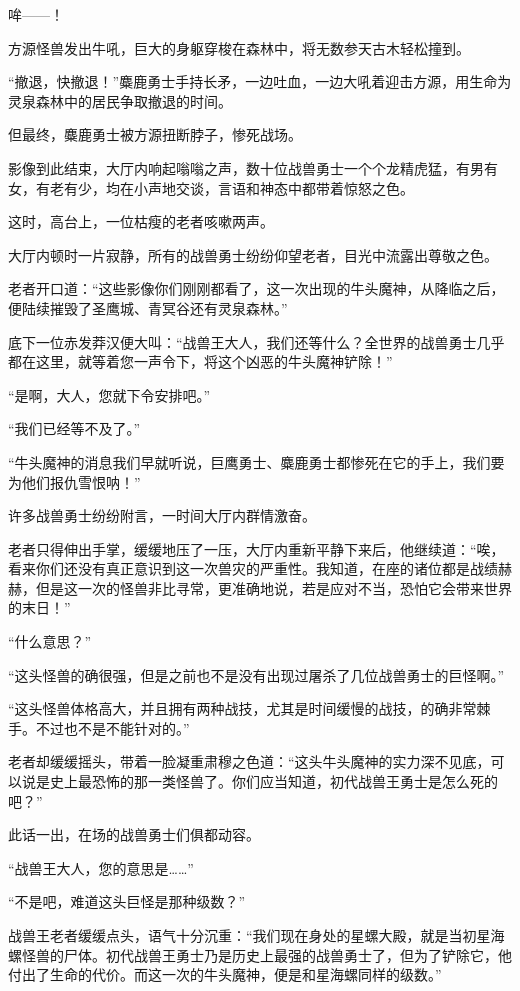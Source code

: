 
\begin{this_body}

哞——！

方源怪兽发出牛吼，巨大的身躯穿梭在森林中，将无数参天古木轻松撞到。

“撤退，快撤退！”麋鹿勇士手持长矛，一边吐血，一边大吼着迎击方源，用生命为灵泉森林中的居民争取撤退的时间。

但最终，麋鹿勇士被方源扭断脖子，惨死战场。

影像到此结束，大厅内响起嗡嗡之声，数十位战兽勇士一个个龙精虎猛，有男有女，有老有少，均在小声地交谈，言语和神态中都带着惊怒之色。

这时，高台上，一位枯瘦的老者咳嗽两声。

大厅内顿时一片寂静，所有的战兽勇士纷纷仰望老者，目光中流露出尊敬之色。

老者开口道：“这些影像你们刚刚都看了，这一次出现的牛头魔神，从降临之后，便陆续摧毁了圣鹰城、青冥谷还有灵泉森林。”

底下一位赤发莽汉便大叫：“战兽王大人，我们还等什么？全世界的战兽勇士几乎都在这里，就等着您一声令下，将这个凶恶的牛头魔神铲除！”

“是啊，大人，您就下令安排吧。”

“我们已经等不及了。”

“牛头魔神的消息我们早就听说，巨鹰勇士、麋鹿勇士都惨死在它的手上，我们要为他们报仇雪恨呐！”

许多战兽勇士纷纷附言，一时间大厅内群情激奋。

老者只得伸出手掌，缓缓地压了一压，大厅内重新平静下来后，他继续道：“唉，看来你们还没有真正意识到这一次兽灾的严重性。我知道，在座的诸位都是战绩赫赫，但是这一次的怪兽非比寻常，更准确地说，若是应对不当，恐怕它会带来世界的末日！”

“什么意思？”

“这头怪兽的确很强，但是之前也不是没有出现过屠杀了几位战兽勇士的巨怪啊。”

“这头怪兽体格高大，并且拥有两种战技，尤其是时间缓慢的战技，的确非常棘手。不过也不是不能针对的。”

老者却缓缓摇头，带着一脸凝重肃穆之色道：“这头牛头魔神的实力深不见底，可以说是史上最恐怖的那一类怪兽了。你们应当知道，初代战兽王勇士是怎么死的吧？”

此话一出，在场的战兽勇士们俱都动容。

“战兽王大人，您的意思是……”

“不是吧，难道这头巨怪是那种级数？”

战兽王老者缓缓点头，语气十分沉重：“我们现在身处的星螺大殿，就是当初星海螺怪兽的尸体。初代战兽王勇士乃是历史上最强的战兽勇士了，但为了铲除它，他付出了生命的代价。而这一次的牛头魔神，便是和星海螺同样的级数。”


\end{this_body}
